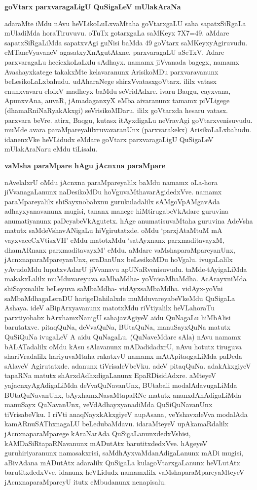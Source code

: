 \noindent
{\bf\large{goVtarx parxvaragaLigU QuSigaLeV mUlakAraNa}}\label{page139}

adaraMte iMdu nAvu heVLikoLuLxvaMtaha goVtarxgaLU saha sapatxSiRgaLa mUladiMda horaTiruvuvu. oTuTx gotarxgaLa saMKeyx {\rm 7X7=49.} aMdare sapatxSiRgaLiMda sapatxvAgi guNisi baMda {\rm 49} goVtarx saMKeyxyAgiruvudu. eMTaneVyavaneV agasatxyXnAgutAtxne. parxvaragaLU aSeTxV. Adare parxvaragaLu hecicxkoLaLxlu sAdhayx. namamx jiVvanada bagegx, namamx Avashayxkatege takakxMte kelavaranunx ArisikoMDu parxvaravanunx beLesikoLaLxbahudu. udAharaNege shirxVvatasxgoVtarx. ililx vatasx enunxvavaru elolxV madheyx baMdu seVridAdxre. ivaru Baqgu, cayxvana, ApunxvAna, auvaR, jAmadaganxyX eMba aivaranunx tamamx piVLigege (dhamaRniNaRyakAkxgi) seVrisikoMDaru. ililx goVtarxda hesaru vatasx. parxvara beVre. atirx, Baqgu, kutasx itAyxdigaLu neVravAgi goVtarxvenisuvudu. muMde avara paraMpareyalilxruvavaranUnx (parxvarakekx) ArisikoLaLxbahudu. idanenxVke heVLidudx eMdare goVtarx parxvaragaLigU QuSigaLeV mUlakAraNaru eMdu tiLisalu.

\noindent
{\bf\large{vaMsha paraMpare hAgu jAcnxna paraMpare}}\label{page139}

nAvelalxrU oMdu jAcnxna paraMpareyalilx baMdu namamx oLa-hora jiVvanagaLanunx naDesikoMDu hoVguvaMthavarAgidedxVve. namamx paraMpareyalilx shiSayxnobabxnu gurukuladalilx sAMgoVpAMgavAda adhayxyanavanunx mugisi, tananx manege hiMtirugabeVkAdare guruvina anumatiyanunx paDeyabeVkAgutetx. hAge anumatisuvaMtaha guruvina AdeVsha matutx saMdeVshavANigaLu hiVgirutatxde. oMdu `parxjAtaMtuM mA vayxvaceCxVtisxVH'\label{139} eMdu matotxMdu `satAyxnanx parxmaditavayxM, dhamARnanx parxmaditavayxM' eMdu. aMdare vaMshaparaMpareyanUnx, jAcnxnaparaMpareyanUnx, eraDanUnx beLesikoMDu hoVgalu. ivugaLalilx yAvudoMdu lupatxvAdarU jiVvanavu apUNaRvenisuvudu. taMde-tAyigaLiMda makakxLalilx muMduvareyuva saMbaMdha- yoVnisaMbaMdha. AcArayxniMda shiSayxnalilx beLeyuva saMbaMdha- vidAyxsaMbaMdha. vidAyx-yoVni saMbaMdhagaLeraDU harigeDahilalxde muMduvareyabeVkeMdu QuSigaLa Ashaya. ideV aBipArxyavanunx matotxMdu riVtiyalilx heVLahoraTu parxtiyobabx bArxhamxNanigU sahajavAgiyeV aidu QuNagaLu hiMbAlisi barutatxve. pitaqQuNa, deVvaQuNa, BUtaQuNa, manuSayxQuNa matutx QuSiQuNa ivugaLeV A aidu QuNagaLu. (QuNaveMdare sAla) nAvu namamx bALATadalilx oMdu kAsu sAlavanunx mADadidadxrU, nAvu hotutx tiruguva shariVradalilx hariyuvaMtaha rakatxvU namamx mAtApitaqgaLiMda paDeda sAlaveV Agirutatxde. adanunx tiVrisaleVbeVku. adeV pitaqQuNa. adakAkxgiyeV tapaRNa matutx shArxdAdhxdigaLanunx EpaRDisidAdxre. aMteyeV yajacnxyAgAdigaLiMda deVvaQuNavanUnx, BUtabali modalAdavugaLiMda BUtaQuNavanUnx, bAyxhamxNasaMtapaRNe matutx ananxdAnAdigaLiMda manuSayx QuNavanUnx, veVdAdhayxyanadiMda QuSiQuNavanUnx tiVrisabeVku. I riVti anaqNayxkAkxgiyeV aupAsana, veYshavxdeVva modalAda kamARnuSAThxnagaLU beLedubaMdavu. idaraMteyeV upAkamaRdalilx jAcnxnaparaMparege kAraNarAda QuSigaLanunxdedxVshisi, kAMDaSiRtapaRNavanunx mADutAtx barutitxdedxVve. hAgeyeV guruhiriyaranunx namasakxrisi, saMdhAyxvaMdanAdigaLanunx mADi mugisi, aBivAdana mADutAtx adaralilx QuSigaLa kulagoVtarxgaLanunx heVLutAtx barutitxdedxVve. idanunx heVLidudx namamxlilx vaMshaparaMpareyaMteyeV jAcnxnaparaMpareyU itutx eMbudanunx nenapisalu.

